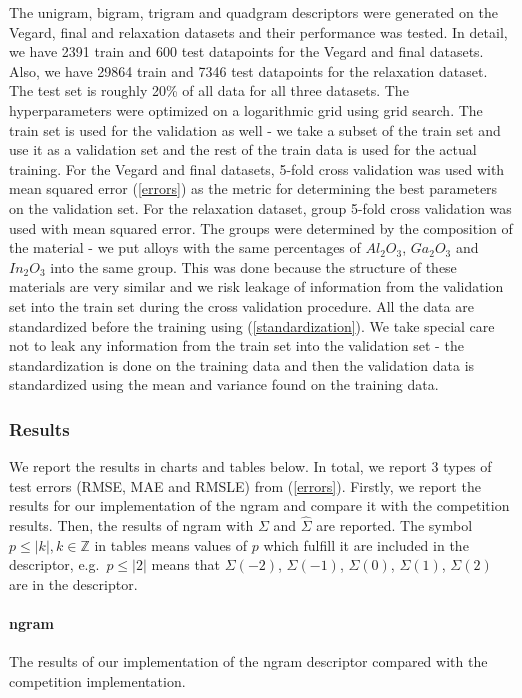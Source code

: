 \documentclass[11pt,oneside,czech,american]{book} %
\theoremstyle{definition} %
\theoremstyle{definition}
\begin{document}
The unigram, bigram, trigram and quadgram descriptors were generated on the Vegard, final and relaxation datasets and their performance was tested. In detail, we have 2391 train and 600 test datapoints for the Vegard and final datasets. Also, we have 29864 train and 7346 test datapoints for the relaxation dataset. The test set is roughly 20\% of all data for all three datasets. The hyperparameters were optimized on a logarithmic grid using grid search. The train set is used for the validation as well - we take a subset of the train set and use it as a validation set and the rest of the train data is used for the actual training. For the Vegard and final datasets, 5-fold cross validation was used with mean squared error (\ref{errors}) as the metric for determining the best parameters on the validation set. For the relaxation dataset, group 5-fold cross validation was used with mean squared error. The groups were determined by the composition of the material - we put alloys with the same percentages of $Al_2 O_3$, $Ga_2 O_3$ and $In_2 O_3$ into the same group. This was done because the structure of these materials are very similar and we risk leakage of information from the validation set into the train set during the cross validation procedure. All the data are standardized before the training using (\ref{standardization}). We take special care not to leak any information from the train set into the validation set - the standardization is done on the training data and then the validation data is standardized using the mean and variance found on the training data.

\subsubsection{Results}
We report the results in charts and tables below. In total, we report 3 types of test errors (RMSE, MAE and RMSLE) from (\ref{errors}). Firstly, we report the results for our implementation of the ngram and compare it with the competition results. Then, the results of ngram with $\Sigma$ and $\hat{\Sigma}$ are reported. The symbol $p\leq|k|, k \in \mathbb{Z}$ in tables means values of $p$ which fulfill it are included in the descriptor, e.g.\ $p\leq|2|$ means that $\Sigma(-2)$, $\Sigma(-1)$, $\Sigma(0)$, $\Sigma(1)$, $\Sigma(2)$ are in the descriptor.

\paragraph{ngram} The results of our implementation of the ngram descriptor compared with the competition implementation.
\end{document}
